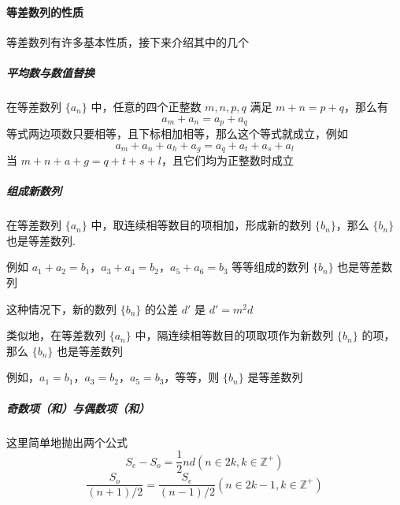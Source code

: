 \documentclass[UTF8]{ctexart}
\begin{document}
	\paragraph{等差数列的性质}
	等差数列有许多基本性质，接下来介绍其中的几个
	\subparagraph{平均数与数值替换}
	在等差数列 $ \{a_n\} $ 中，任意的四个正整数 $m,n,p,q$ 满足 $m+n=p+q$，那么有
	\[a_m+a_n=a_p+a_q\]
	等式两边项数只要相等，且下标相加相等，那么这个等式就成立，例如
	\[a_m+a_n+a_h+a_g = a_q + a_t + a_s + a_l\]
	当 $m+n+a+g = q+t+s+l$，且它们均为正整数时成立
	\subparagraph{组成新数列}
	在等差数列 $\{a_n\} $ 中，取连续相等数目的项相加，形成新的数列 $\{b_n\}$，那么 $\{b_n\}$ 也是等差数列.
	\par
	例如 $a_1+a_2=b_1$，$a_3+a_4=b_2$，$a_5+a_6=b_3$ 等等组成的数列 $\{b_n\}$ 也是等差数列
	\par
	这种情况下，新的数列 $\{b_n\}$ 的公差 $d'$ 是 $d' = m^2 d$
	\par
	类似地，在等差数列 $\{a_n\}$ 中，隔连续相等数目的项取项作为新数列 $\{b_n\}$ 的项，那么 $\{b_n\}$ 也是等差数列
	\par
	例如，$a_1=b_1$，$a_3=b_2$，$a_5=b_3$，等等，则 $\{b_n\}$ 是等差数列
	\subparagraph{奇数项（和）与偶数项（和）}
	这里简单地抛出两个公式
	\[S_e - S_o = \frac{1}{2}nd (n \in 2k, k \in \mathbb{Z} ^ +)\]
	\[\frac{S_o}{(n+1)/2} = \frac{S_e}{(n-1)/2} (n \in 2k-1, k \in \mathbb{Z} ^ +)\]
\end{document}
